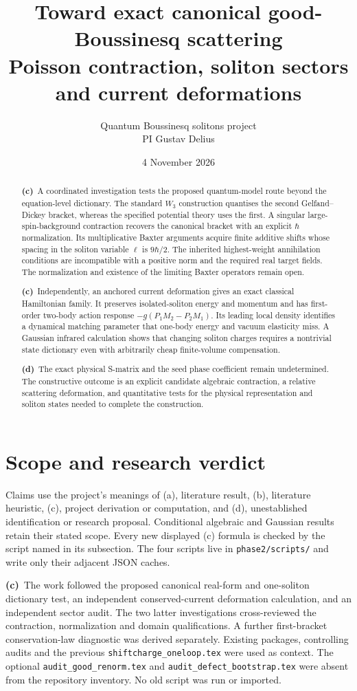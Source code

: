 \documentclass[11pt,a4paper]{article}
\title{Toward exact canonical good-Boussinesq scattering\\
Poisson contraction, soliton sectors and current deformations}
\author{Quantum Boussinesq solitons project\\PI Gustav Delius}
\date{4 November 2026}
\newcommand{\C}{\textbf{(c)}\ }
\newcommand{\D}{\textbf{(d)}\ }
\newcommand{\file}[1]{\nolinkurl{#1}}
\begin{document}
\maketitle
\begin{abstract}
\C A coordinated investigation tests the proposed quantum-model route beyond
the equation-level dictionary. The standard $W_3$ construction quantises the
second Gelfand--Dickey bracket, whereas the specified potential theory uses
the first. A singular large-spin-background contraction recovers the canonical
bracket with an explicit $\hbar$ normalization. Its multiplicative Baxter
arguments acquire finite additive shifts whose spacing in the soliton variable
$\ell$ is $9\hbar/2$. The inherited highest-weight annihilation conditions
are incompatible with a positive norm and the required real target fields.
The normalization and existence of the limiting Baxter operators remain open.

\C Independently, an anchored current deformation gives an exact classical
Hamiltonian family. It preserves isolated-soliton energy and momentum and
has first-order two-body action response $-g(P_1M_2-P_2M_1)$.
Its leading local density
identifies a dynamical matching parameter that one-body energy and vacuum
elasticity miss. A Gaussian infrared calculation shows that changing soliton
charges requires a nontrivial state dictionary even with arbitrarily cheap
finite-volume compensation.

\D The exact physical S-matrix and the seed phase coefficient remain
undetermined. The constructive outcome is an explicit candidate algebraic
contraction, a relative scattering deformation, and quantitative tests for the
physical representation and soliton states needed to complete the construction.
\end{abstract}

\section{Scope and research verdict}
Claims use the project's meanings of (a), literature result, (b), literature
heuristic, (c), project derivation or computation, and (d), unestablished
identification or research proposal. Conditional algebraic and Gaussian
results retain their stated scope. Every new displayed (c) formula is checked
by the script named in its subsection. The four scripts live in
\file{phase2/scripts/} and write only their adjacent JSON caches.

\C The work followed the proposed canonical real-form and one-soliton
dictionary test, an independent conserved-current deformation calculation,
and an independent sector audit. The two latter investigations cross-reviewed
the contraction, normalization and domain qualifications. A further
first-bracket conservation-law diagnostic was derived separately.
Existing packages, controlling audits and the previous
\file{shiftcharge_oneloop.tex} were used as context. The optional
\file{audit_good_renorm.tex} and \file{audit_defect_bootstrap.tex} were absent
from the repository inventory. No old script was run or imported.
\end{document}
